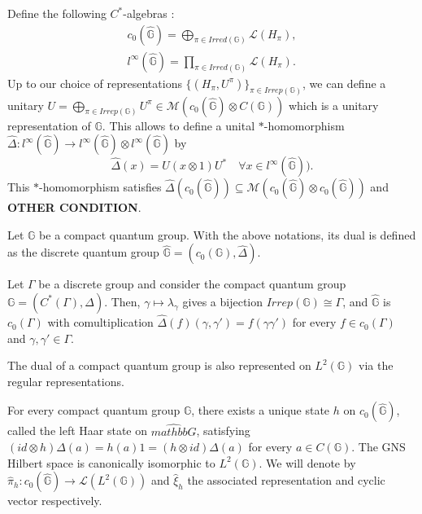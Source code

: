 Define the following $C^*$-algebras :
\[\begin{array}{c}
c_0(\hat{\mathbb G})= \bigoplus_{\pi\in Irred(\mathbb G)} \mathcal L(H_\pi),\\
l^\infty(\hat{\mathbb G})= \prod_{\pi\in Irred(\mathbb G)} \mathcal L(H_\pi).
\end{array}\]
Up to our choice of representations $\{(H_\pi,U^\pi)\}_{\pi\in Irrep(\mathbb G)}$, we can define a unitary $U = \bigoplus_{\pi\in Irrep(\mathbb G)} U^\pi\in \mathcal M(c_0(\hat{\mathbb G}) \otimes C(\mathbb G))$ which is a unitary representation of $\mathbb G$. This allows to define a unital $*$-homomorphism $\hat \Delta : l^\infty(\hat{\mathbb G}) \rightarrow l^\infty(\hat{\mathbb G})\otimes l^\infty(\hat{\mathbb G})$ by 
\[\hat\Delta ( x) = U(x \otimes 1)U^*\quad \forall x\in l^\infty(\hat{\mathbb G})).\]
This $*$-homomorphism satisfies $\hat\Delta(c_0(\hat{\mathbb G}))\subseteq \mathcal M(c_0(\hat{\mathbb G})\otimes c_0(\hat{\mathbb G}))$ and \textbf{OTHER CONDITION}.
\begin{definition}
Let $\mathbb G$ be a compact quantum group. With the above notations, its dual is defined as the discrete quantum group $\hat{\mathbb G} = (c_0(\mathbb G),\hat\Delta)$.
\end{definition}

\begin{Expl} Let $\Gamma$ be a discrete group and consider the compact quantum group $\mathbb G=(C^*(\Gamma),\Delta)$. Then, $\gamma\mapsto \lambda_\gamma$ gives a bijection $Irrep(\mathbb G)\cong \Gamma$, and $\hat{\mathbb G}$ is $c_0(\Gamma)$ with comultiplication $\hat\Delta (f)(\gamma,\gamma') = f(\gamma\gamma')$ for every $f\in c_0(\Gamma)$ and $\gamma,\gamma'\in\Gamma$.
\end{Expl}

The dual of a compact quantum group is also represented on $L^2(\mathbb G)$ via the regular representations. 
\begin{prop}
For every compact quantum group $\mathbb G$, there exists a unique state $h$ on $c_0(\hat{\mathbb G})$, called the left Haar state on $\hat{mathbb G}$, satisfying $(id\otimes h)\Delta(a) = h(a)1 = (h\otimes id)\Delta(a)$ for every $a\in C(\mathbb G)$. The GNS Hilbert space is canonically isomorphic to $L^2(\mathbb G)$. We will denote by $\hat \pi_h : c_0(\hat{\mathbb G})\rightarrow \mathcal L(L^2(\mathbb G))$ and $\hat \xi_h$ the associated representation and cyclic vector respectively.  
\end{prop}

